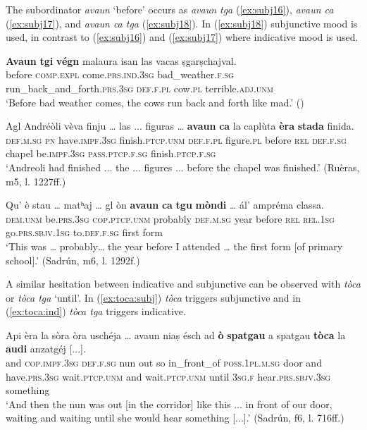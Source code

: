 The subordinator \textit{avaun} `before' occurs as \textit{avaun tga} (\ref{ex:subj16}), \textit{avaun ca} (\ref{ex:subj17}), and \textit{avaun ca tga} (\ref{ex:subj18}). In (\ref{ex:subj18}) subjunctive mood is used, in contrast to (\ref{ex:subj16}) and (\ref{ex:subj17}) where indicative mood is used.

\ea
\label{ex:subj16}
\gll   \textbf{Avaun} \textbf{tgi} \textbf{végn} malaura isan las vacas ṣgarṣchajval.\\
before \textsc{comp.expl} come.\textsc{prs.ind.3sg} bad\_weather.\textsc{f.sg} run\_back\_and\_forth.\textsc{prs.3sg} \textsc{def.f.pl} cow.\textsc{pl} terrible.\textsc{adj.unm} \\
\glt `Before bad weather comes, the cows run back and forth like mad.' ()
\z

\ea
\label{ex:subj17}
\gll  Agl Andréòli vèva finju … las ... figuras … \textbf{avaun} \textbf{ca} la caplùta \textbf{èra} \textbf{stada} finida.\\
\textsc{def.m.sg} \textsc{pn} have.\textsc{impf.3sg} finish.\textsc{ptcp.unm} {} \textsc{def.f.pl} {} figure.\textsc{pl} {} before \textsc{rel} \textsc{def.f.sg} chapel be.\textsc{impf.3sg} \textsc{pass.ptcp.f.sg} finish.\textsc{ptcp.f.sg} \\
\glt `Andreoli had finished ... the ... figures ... before the chapel was finished.' (Ruèras, m5, l. 1227ff.)
\z

\ea
\label{ex:subj18}
\gll    Qu’ è stau … matʰaj … gl òn \textbf{avaun} \textbf{ca} \textbf{tgu} \textbf{mòndi} … ál’ ampréma classa.\\
\textsc{dem.unm} be.\textsc{prs.3sg} \textsc{cop.ptcp.unm} {} probably {} \textsc{def.m.sg} year before \textsc{rel} \textsc{rel.1sg} go.\textsc{prs.sbjv.1sg} {} to.\textsc{def.f.sg} first form\\
\glt `This was … probably… the year before I attended … the first form [of primary school].' (Sadrún, m6, l. 1292f.)
\z


A similar hesitation between indicative and subjunctive can be observed with \textit{tòca} or \textit{tòca tga} `until'. In (\ref{ex:toca:subj}) \textit{tòca} triggers subjunctive and in (\ref{ex:toca:ind}) \textit{tòca tga} triggers indicative.

\ea
\label{ex:toca:subj}
\gll    Api èra la sòra òra uschéja … avaun niaṣ ésch ad \textbf{ò} \textbf{spatgau} a spatgau \textbf{tòca} la \textbf{audi} anzatgéj [...].\\
and \textsc{cop.impf.3sg} \textsc{def.f.sg} nun out so {} in\_front\_of \textsc{poss.1pl.m.sg} door and have.\textsc{prs.3sg} wait.\textsc{ptcp.unm} and wait.\textsc{ptcp.unm} until \textsc{3sg.f} hear.\textsc{prs.sbjv.3sg} something\\
\glt `And then the nun was out [in the corridor] like this ... in front of our door, waiting and waiting until she would hear something [...].' (Sadrún, f6, l. 716ff.)
\z

